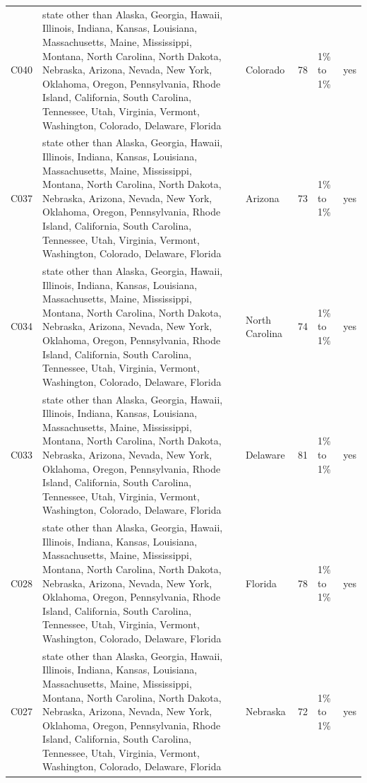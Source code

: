 \documentclass[a4paper,10pt]{article}
\newif\ifreviewmarks
\newcommand{\reviewrule}{\noindent{\color{BrickRed}\rule{\linewidth}{0.8pt}}}
\newenvironment{drafted}[1][]{%
  \ifreviewmarks\par\addvspace{\medskipamount}\reviewrule\par\nopagebreak
  \noindent{\color{BrickRed}\sffamily\footnotesize\textbf{Thesis Draft}\quad #1\hfill review}\par\nopagebreak\smallskip\fi}{%
  \ifreviewmarks\par\smallskip\noindent{\color{BrickRed}\sffamily\footnotesize end of thesis draft}\par\nopagebreak\reviewrule\par\medskip\fi}
\begin{document}
\begin{drafted}[plain-language layer: churn100-s4-c3]
{\begin{longtable}{@{}lllrlc@{}}
C040 & state other than Alaska, Georgia, Hawaii, Illinois, Indiana, Kansas, Louisiana, Massachusetts, Maine, Mississippi, Montana, North Carolina, North Dakota, Nebraska, Arizona, Nevada, New York, Oklahoma, Oregon, Pennsylvania, Rhode Island, California, South Carolina, Tennessee, Utah, Virginia, Vermont, Washington, Colorado, Delaware, Florida & Colorado & 78 & 1\% to 1\% & \textcolor{OliveGreen}{yes} \\
C037 & state other than Alaska, Georgia, Hawaii, Illinois, Indiana, Kansas, Louisiana, Massachusetts, Maine, Mississippi, Montana, North Carolina, North Dakota, Nebraska, Arizona, Nevada, New York, Oklahoma, Oregon, Pennsylvania, Rhode Island, California, South Carolina, Tennessee, Utah, Virginia, Vermont, Washington, Colorado, Delaware, Florida & Arizona & 73 & 1\% to 1\% & \textcolor{OliveGreen}{yes} \\
C034 & state other than Alaska, Georgia, Hawaii, Illinois, Indiana, Kansas, Louisiana, Massachusetts, Maine, Mississippi, Montana, North Carolina, North Dakota, Nebraska, Arizona, Nevada, New York, Oklahoma, Oregon, Pennsylvania, Rhode Island, California, South Carolina, Tennessee, Utah, Virginia, Vermont, Washington, Colorado, Delaware, Florida & North Carolina & 74 & 1\% to 1\% & \textcolor{OliveGreen}{yes} \\
C033 & state other than Alaska, Georgia, Hawaii, Illinois, Indiana, Kansas, Louisiana, Massachusetts, Maine, Mississippi, Montana, North Carolina, North Dakota, Nebraska, Arizona, Nevada, New York, Oklahoma, Oregon, Pennsylvania, Rhode Island, California, South Carolina, Tennessee, Utah, Virginia, Vermont, Washington, Colorado, Delaware, Florida & Delaware & 81 & 1\% to 1\% & \textcolor{OliveGreen}{yes} \\
C028 & state other than Alaska, Georgia, Hawaii, Illinois, Indiana, Kansas, Louisiana, Massachusetts, Maine, Mississippi, Montana, North Carolina, North Dakota, Nebraska, Arizona, Nevada, New York, Oklahoma, Oregon, Pennsylvania, Rhode Island, California, South Carolina, Tennessee, Utah, Virginia, Vermont, Washington, Colorado, Delaware, Florida & Florida & 78 & 1\% to 1\% & \textcolor{OliveGreen}{yes} \\
C027 & state other than Alaska, Georgia, Hawaii, Illinois, Indiana, Kansas, Louisiana, Massachusetts, Maine, Mississippi, Montana, North Carolina, North Dakota, Nebraska, Arizona, Nevada, New York, Oklahoma, Oregon, Pennsylvania, Rhode Island, California, South Carolina, Tennessee, Utah, Virginia, Vermont, Washington, Colorado, Delaware, Florida & Nebraska & 72 & 1\% to 1\% & \textcolor{OliveGreen}{yes} \\

\end{longtable}}
\end{drafted}
\end{document}
